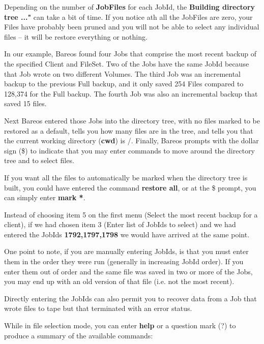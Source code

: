 Depending on the number of {\bf JobFiles} for each JobId, the {\bf Building
directory tree ..."} can take a bit of time. If you notice ath all the
JobFiles are zero, your Files have probably been pruned and you will not be
able to select any individual files -- it will be restore everything or
nothing.

In our example, Bareos found four Jobs that comprise the most recent backup of
the specified Client and FileSet. Two of the Jobs have the same JobId because
that Job wrote on two different Volumes. The third Job was an incremental
backup to the previous Full backup, and it only saved 254 Files compared to
128,374 for the Full backup. The fourth Job was also an incremental backup
that saved 15 files.

Next Bareos entered those Jobs into the directory tree, with no files marked
to be restored as a default, tells you how many files are in the tree, and
tells you that the current working directory ({\bf cwd}) is /. Finally, Bareos
prompts with the dollar sign (\$) to indicate that you may enter commands to
move around the directory tree and to select files.

If you want all the files to automatically be marked when the directory
tree is built, you could have entered the command {\bf restore all}, or
at the \$ prompt, you can simply enter {\bf mark *}.

Instead of choosing item 5 on the first menu (Select the most recent backup
for a client), if we had chosen item 3 (Enter list of JobIds to select) and we
had entered the JobIds {\bf 1792,1797,1798} we would have arrived at the same
point.

One point to note, if you are manually entering JobIds, is that you must enter
them in the order they were run (generally in increasing JobId order). If you
enter them out of order and the same file was saved in two or more of the
Jobs, you may end up with an old version of that file (i.e. not the most
recent).

Directly entering the JobIds can also permit you to recover data from
a Job that wrote files to tape but that terminated with an error status.

While in file selection mode, you can enter {\bf help} or a question mark (?)
to produce a summary of the available commands:

